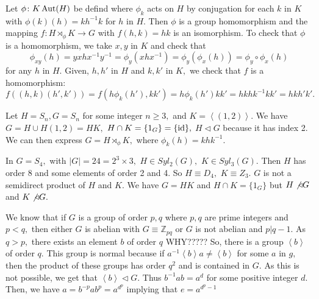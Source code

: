 Let $ \phi \colon K \operatorname{Aut}(H)$ be defind where $\phi_k$ acts on $H$ by conjugation
for each $k$ in $K$ with $ \phi(k)(h) = k h^{-1} k$
for $h$ in $H.$ Then $ \phi$ is a group homomorphism and the mapping $ f \colon H \rtimes_
\phi K \to G$ with $f(h,k) = hk$ is an isomorphism.
To check that $\phi$ is a  homomorphism, we take $x,y$ in $K$ and check that
$$ \phi_{xy} (h) = y x h x^{-1} y^{-1} = \phi_y(x h x^{-1}) = \phi_y( \phi_x(h))
= \phi_y \circ \phi_x (h)$$
for  any $h$ in $H.$
Given, $h, h'$ in $H$ and $k, k'$ in $K,$ we check that $f$ is a homomorphism:
$$f((h,k)(h',k')) = f(h \phi_k(h'), kk') = h \phi_k(h') kk'
=  h k h k^{-1} k k' = hk h'k'.$$

\begin{example}
	Let $H = S_n, G = S_n$ for some integer $n \geq 3,$ and $ K = \left<(1,2) \right>.$
	We have $ G = H \cup H (1,2) = HK,$ $H \cap K = \{ 1_G \} = \{ \operatorname{id} \},$
	$H \triangleleft G$ because it has index 2.
	We can then express $G = H \rtimes_ \phi K,$ where $ \phi_k(h) = khk^{-1}.$
\end{example}

\begin{example}
	In $G = S_4,$ with $ \lvert G \rvert = 24 = 2^3 \times  3,$ $H \in Syl_2(G),$
	$K \in Syl_3(G).$ Then $H$ has order $8$ and some elements of order 2 and 4.
	So $H \equiv D_4,$ $K \equiv Z_3.$ $G$ is not a semidirect product of $H$ and $K.$
	We have $G =HK$ and $ H \cap K = \{ 1_G \}$ but $H \not \triangleleft G$ and
	$K \not \triangleleft G.$
\end{example}

\begin{example}
	We know that if $G$ is a group of order $p,q$ where $p,q$ are prime integers and $p < q,$
	then either $G$ is abelian with $G \equiv \mathbb{Z}_{pq}$ or $G$ is not abelian and
	$p | q-1.$
	As $q > p,$ there exists an element $b$ of order $q$ WHY?????
	So, there is a group $\left< b \right>$ of order $q.$ This group is normal because
	if $a^{-1} \left<b \right> a \not = \left< b \right>$ for some $a$ in $g,$
	then the product of these groups has order $q^2$ and is contained in $G.$
	As this is not possible, we get that $ \left<b \right> \triangleleft G.$
	Thus $b^{-1}ab = a^d$ for some positive integer $d.$ Then, we have
	$ a = b^{-p} a b^p = a^{d^p}$ implying that $e = a^{d^p -1} $
\end{example}

